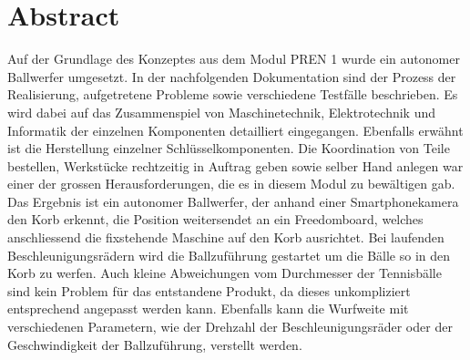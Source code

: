 
\section*{Abstract}
Auf der Grundlage des Konzeptes aus dem Modul PREN 1 wurde ein autonomer Ballwerfer umgesetzt. In der nachfolgenden Dokumentation sind der Prozess der Realisierung, aufgetretene Probleme sowie verschiedene Testfälle beschrieben. Es wird dabei auf das Zusammenspiel von Maschinetechnik, Elektrotechnik und Informatik der einzelnen Komponenten detailliert eingegangen. Ebenfalls erwähnt ist die Herstellung einzelner Schlüsselkomponenten. Die Koordination von Teile bestellen, Werkstücke rechtzeitig in Auftrag geben sowie selber Hand anlegen war einer der grossen Herausforderungen, die es in diesem Modul zu bewältigen gab. Das Ergebnis ist ein autonomer Ballwerfer, der anhand einer Smartphonekamera den Korb erkennt, die Position weitersendet an ein Freedomboard, welches anschliessend die fixstehende Maschine auf den Korb ausrichtet. Bei laufenden Beschleunigungsrädern wird die Ballzuführung gestartet um die Bälle so in den Korb zu werfen. Auch kleine Abweichungen vom Durchmesser der Tennisbälle sind kein Problem für das entstandene Produkt, da dieses unkompliziert entsprechend angepasst werden kann. Ebenfalls kann die Wurfweite mit verschiedenen Parametern, wie der Drehzahl der Beschleunigungsräder oder der Geschwindigkeit der Ballzuführung, verstellt werden.

